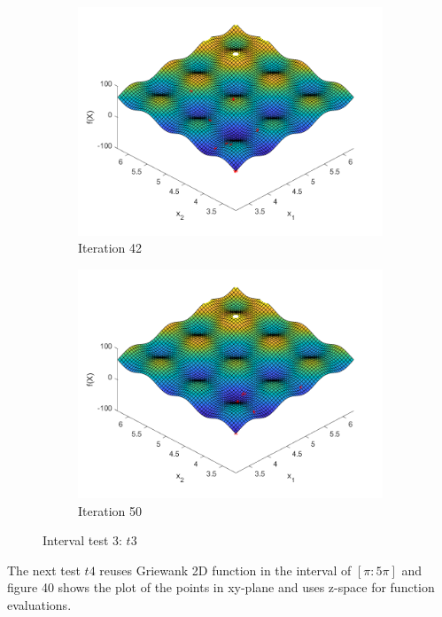 \begin{figure}
\begin{subfigure}[b]{0.4\textwidth}
   \includegraphics[width=\textwidth]{img/smpl/rast2dshft/loa-iter-42}
   \caption{Iteration 42}
   \label{fig:i3-iter-6}
 \end{subfigure}
 \begin{subfigure}[b]{0.4\textwidth}
   \includegraphics[width=\textwidth]{img/smpl/rast2dshft/loa-iter-50}
   \caption{Iteration 50}
   \label{fig:i3-iter-7}
 \end{subfigure}
 \caption{Interval test 3: $t3$}
\end{figure}

\par The next test $t4$ reuses Griewank 2D function in the interval of $[\pi:5\pi]$ and figure 40 shows the plot of the points in xy-plane and uses z-space for function evaluations.

